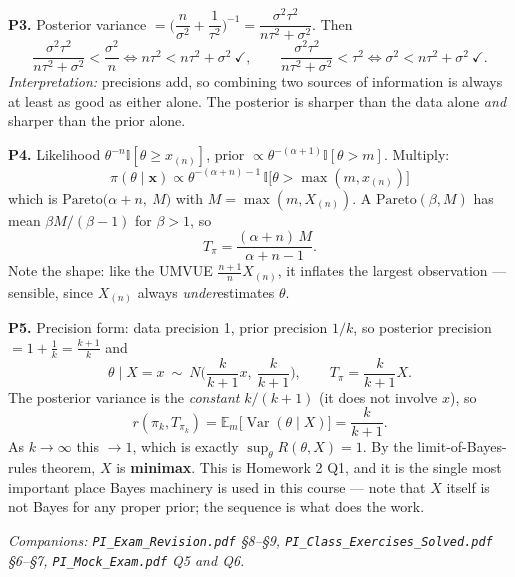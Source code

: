\documentclass[11pt]{article}
\newcommand{\E}{\mathbb{E}}
\newcommand{\Var}{\operatorname{Var}}
\newcommand{\I}{\mathbb{I}}
\begin{document}
\smallskip
\noindent\textbf{P3.} Posterior variance
$=\Big(\dfrac{n}{\sigma^2}+\dfrac{1}{\tau^2}\Big)^{-1}=\dfrac{\sigma^2\tau^2}{n\tau^2+\sigma^2}$.
Then
\[
\frac{\sigma^2\tau^2}{n\tau^2+\sigma^2}<\frac{\sigma^2}{n}
\iff n\tau^2<n\tau^2+\sigma^2\ \checkmark,
\qquad
\frac{\sigma^2\tau^2}{n\tau^2+\sigma^2}<\tau^2
\iff \sigma^2<n\tau^2+\sigma^2\ \checkmark .
\]
\emph{Interpretation:} precisions add, so combining two sources of information is always at
least as good as either alone. The posterior is sharper than the data alone \emph{and} sharper
than the prior alone.

\smallskip
\noindent\textbf{P4.} Likelihood $\theta^{-n}\I[\theta\ge x_{(n)}]$, prior
$\propto\theta^{-(\alpha+1)}\I[\theta>m]$. Multiply:
\[
\pi(\theta\mid\mathbf x)\propto\theta^{-(\alpha+n)-1}\,\I\big[\theta>\max(m,x_{(n)})\big]
\]
which is $\mathrm{Pareto}\big(\alpha+n,\ M\big)$ with $M=\max(m,X_{(n)})$. A
$\mathrm{Pareto}(\beta,M)$ has mean $\beta M/(\beta-1)$ for $\beta>1$, so
\[
T_\pi=\frac{(\alpha+n)\,M}{\alpha+n-1}.
\]
Note the shape: like the UMVUE $\tfrac{n+1}{n}X_{(n)}$, it inflates the largest observation ---
sensible, since $X_{(n)}$ always \emph{under}estimates $\theta$.

\smallskip
\noindent\textbf{P5.} Precision form: data precision 1, prior precision $1/k$, so posterior
precision $=1+\tfrac1k=\tfrac{k+1}{k}$ and
\[
\theta\mid X=x\ \sim\ N\Big(\frac{k}{k+1}x,\ \frac{k}{k+1}\Big),
\qquad T_\pi=\frac{k}{k+1}X .
\]
The posterior variance is the \emph{constant} $k/(k+1)$ (it does not involve $x$), so
\[
r(\pi_k,T_{\pi_k})=\E_m\big[\Var(\theta\mid X)\big]=\frac{k}{k+1}.
\]
As $k\to\infty$ this $\to1$, which is exactly $\sup_\theta R(\theta,X)=1$. By the
limit-of-Bayes-rules theorem, $X$ is \textbf{minimax}. This is Homework 2 Q1, and it is the
single most important place Bayes machinery is used in this course --- note that $X$ itself is
not Bayes for any proper prior; the sequence is what does the work.

\vfill
\begin{center}
\small\itshape
Companions: \texttt{PI\_Exam\_Revision.pdf} \S8--\S9,
\texttt{PI\_Class\_Exercises\_Solved.pdf} \S6--\S7,
\texttt{PI\_Mock\_Exam.pdf} Q5 and Q6.
\end{center}
\end{document}
